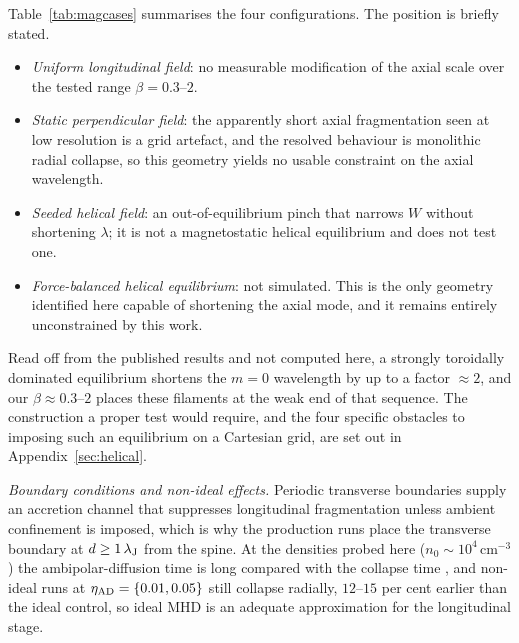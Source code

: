 \documentclass[usenatbib,twoside,twocolumn]{mnras}
\begin{document}
Table~\ref{tab:magcases} summarises the four configurations. The position is briefly stated.

\begin{itemize}\setlength{\itemsep}{1pt}
\item \emph{Uniform longitudinal field}: no measurable modification of the axial scale over the tested range $\beta=0.3$--$2$.
\item \emph{Static perpendicular field}: the apparently short axial fragmentation seen at low resolution is a grid artefact, and the resolved behaviour is monolithic radial collapse, so this geometry yields no usable constraint on the axial wavelength.
\item \emph{Seeded helical field}: an out-of-equilibrium pinch that narrows $W$ without shortening $\lambda$; it is not a magnetostatic helical equilibrium and does not test one.
\item \emph{Force-balanced helical equilibrium}: not simulated. This is the only geometry identified here capable of shortening the axial mode, and it remains entirely unconstrained by this work.
\end{itemize}

Read off from the published \citet{Fiege2000} results and not computed here, a strongly toroidally dominated equilibrium shortens the $m=0$ wavelength by up to a factor $\approx2$, and our $\beta\approx0.3$--$2$ places these filaments at the weak end of that sequence. The construction a proper test would require, and the four specific obstacles to imposing such an equilibrium on a Cartesian grid, are set out in Appendix~\ref{sec:helical}.

\emph{Boundary conditions and non-ideal effects.} Periodic transverse boundaries supply an accretion channel that suppresses longitudinal fragmentation unless ambient confinement is imposed, which is why the production runs place the transverse boundary at $d\geq1\,\lambda_{\rm J}$ from the spine. At the densities probed here ($n_0\sim10^4$\,cm$^{-3}$) the ambipolar-diffusion time is long compared with the collapse time \citep{Tassis2004}, and non-ideal runs at $\eta_{\rm AD}=\{0.01,0.05\}$ still collapse radially, $12$--$15$ per cent earlier than the ideal control, so ideal MHD is an adequate approximation for the longitudinal stage.
\end{document}
